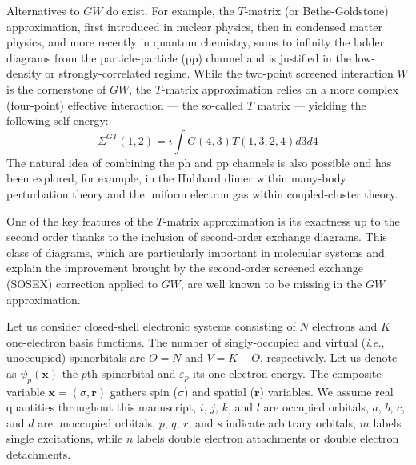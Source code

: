 \documentclass[aip,jcp,reprint,noshowkeys,superscriptaddress]{revtex4-1}
\newcommand{\ie}{\textit{i.e.}}
\newcommand{\br}{\mathbf{r}}
\newcommand{\bx}{\mathbf{x}}
\newcommand{\e}[2]{\eps_{#1}^{#2}}
\newcommand{\SO}[1]{\psi_{#1}}
\newcommand{\eps}{\varepsilon}
\begin{document}
Alternatives to $GW$ do exist. For example, the $T$-matrix (or Bethe-Goldstone) approximation, first introduced in nuclear physics, \cite{Bethe_1957,Baym_1961,Baym_1962,Danielewicz_1984a,Danielewicz_1984b} then in condensed matter physics, \cite{Liebsch_1981,Bickers_1989,Bickers_1991,Katsnelson_1999,Katsnelson_2002,Zhukov_2005,vonFriesen_2010,Romaniello_2012,Gukelberger_2015} and more recently in quantum chemistry, \cite{Zhang_2017,Li_2021b} sums to infinity the ladder diagrams from the particle-particle (pp) channel and is justified in the low-density or strongly-correlated regime. \cite{Danielewicz_1984a,Danielewicz_1984b,Liebsch_1981,Shepherd_2014}
While the two-point screened interaction $W$ is the cornerstone of $GW$, the $T$-matrix approximation relies on a more complex (four-point) effective interaction --- the so-called $T$ matrix --- yielding the following self-energy: 
\begin{equation}
	\Sigma^{GT}(1,2) = i \int G(4,3) T(1,3;2,4) d3 d4
\end{equation}
The natural idea of combining the ph and pp channels is also possible and has been explored, for example, in the Hubbard dimer within many-body perturbation theory \cite{Romaniello_2012} and the uniform electron gas \cite{Loos_2016} within coupled-cluster theory. \cite{Shepherd_2014}

One of the key features of the $T$-matrix approximation is its exactness up to the second order thanks to the inclusion of second-order exchange diagrams.
This class of diagrams, which are particularly important in molecular systems and explain the improvement brought by the second-order screened exchange (SOSEX) correction applied to $GW$, \cite{Romaniello_2009a,Ren_2015,Loos_2018b} are well known to be missing in the $GW$ approximation.

Let us consider closed-shell electronic systems consisting of $N$ electrons and $K$ one-electron basis functions.
The number of singly-occupied and virtual (\ie, unoccupied) spinorbitals are $O = N$ and $V = K - O$, respectively.
Let us denote as $\SO{p}(\bx)$ the $p$th spinorbital and $\e{p}{}$ its one-electron energy.
The composite variable $\bx = (\sigma,\br)$ gathers spin ($\sigma$) and spatial ($\br$) variables.
We assume real quantities throughout this manuscript, $i$, $j$, $k$, and $l$ are occupied orbitals, $a$, $b$, $c$, and $d$ are unoccupied orbitals, $p$, $q$, $r$, and $s$ indicate arbitrary orbitals, $m$ labels single excitations, while $n$ labels double electron attachments or double electron detachments.
\end{document}
